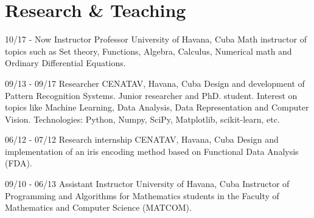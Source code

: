 \documentclass[]{friggeri-cv}
\begin{document}
\section{Research \& Teaching}
\begin{entrylist}
  \entry
    {10/17 - Now}
    {Instructor Professor}
    {University of Havana, Cuba}
    {Math instructor of topics such as Set theory, Functions, Algebra, Calculus, Numerical math and Ordinary Differential Equations.\\}
  
  \entry
    {09/13 - 09/17}
    {Researcher}
    {CENATAV, Havana, Cuba}
    {Design and development of Pattern Recognition Systems. Junior researcher and PhD. student. Interest on topics like Machine Learning, Data Analysis, Data Representation and Computer Vision. Technologies: Python, Numpy, SciPy, Matplotlib, scikit-learn, etc.\\}
    
  \entry
    {06/12 - 07/12}
    {Research internship}
    {CENATAV, Havana, Cuba}
    {Design and implementation of an iris encoding method based on Functional Data Analysis (FDA).\\}
    
  \entry
    {09/10 - 06/13}
    {Assistant Instructor}
    {University of Havana, Cuba}
    {Instructor of Programming and Algorithms for Mathematics students in the Faculty of Mathematics and Computer Science (MATCOM).\\}
\end{entrylist}
\end{document}
